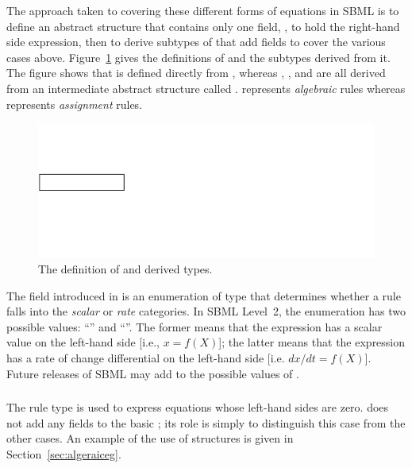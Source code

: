 \documentclass[10pt,twocolumntoc]{cekarticle}
\newcommand{\vref}[1]{\ref{#1}}
\begin{document}
The approach taken to covering these different forms of equations in SBML
is to define an abstract  structure that contains only one
field, , to hold the right-hand side expression, then to
derive subtypes of  that add fields to cover the various cases
above.  Figure~\vref{fig:rules} gives the definitions of  and
the subtypes derived from it.  The figure shows that 
is defined directly from , whereas
, , and
 are all derived from an intermediate abstract
structure called .   represents
\emph{algebraic} rules whereas  represents
\emph{assignment} rules.

\begin{figure}[htb]
  \centering
  \includegraphics[scale = 0.68]{rule}
  \caption{The definition of  and derived types.}
  \label{fig:rules}
\end{figure}

The  field introduced in  is an
enumeration of type  that determines whether a
rule falls into the \emph{scalar} or \emph{rate} categories. In
SBML Level~2, the enumeration has two possible values:
``'' and ``''.  The former means that
the expression has a scalar value on the left-hand side [i.e., $x
= f(X)$]; the latter means that
the expression has a rate of change differential on the left-hand
side [i.e. $dx/dt = f(X)$]. Future releases of SBML may
add to the possible values of .


\subsubsection{}

The rule type  is used to express equations
whose left-hand sides are zero.   does not
add any fields to the basic ; its role is simply to
distinguish this case from the other cases.  An example of the use
of  structures is given in
Section~\ref{sec:algeraiceg}.
\end{document}
